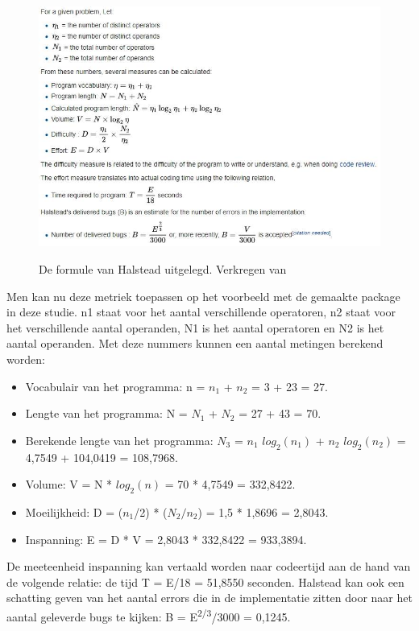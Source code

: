 \begin{figure}
	\begin{center}
		\caption{De formule van Halstead uitgelegd. Verkregen van \textcite{halstead}}
		\includegraphics[width=16cm]{img/halstead}\\[0.5cm]
	\end{center}
\end{figure}


Men kan nu deze metriek toepassen op het voorbeeld met de gemaakte package in deze studie. n1 staat voor het aantal verschillende operatoren, n2 staat voor het verschillende aantal operanden, N1 is het aantal operatoren en N2 is het aantal operanden. Met deze nummers kunnen een aantal metingen berekend worden:
\begin{itemize}
	\item Vocabulair van het programma: n = $n_1$ + $n_2$ = 3 + 23 = 27.
	\item Lengte van het programma: N = $N_1$ + $N_2$ = 27 + 43 = 70.
	\item Berekende lengte van het programma: $N_3$ = $n_1$ $log_{2}(n_1)$ + $n_2$ $log_{2}(n_2)$ = 4,7549 +  104,0419 = 108,7968.
	\item Volume: V = N * $log_{2}(n)$ = 70 * 4,7549 = 332,8422.
	\item Moeilijkheid: D = ($n_1$/2) * ($N_2/n_2$) = 1,5 * 1,8696 = 2,8043.
	\item Inspanning: E = D * V = 2,8043 * 332,8422 = 933,3894.
\end{itemize}
De meeteenheid inspanning kan vertaald worden naar codeertijd aan de hand van de volgende relatie: de tijd T = E/18 = 51,8550 seconden.
Halstead kan ook een schatting geven van het aantal errors die in de implementatie zitten door naar het aantal geleverde bugs te kijken: B = E\textsuperscript{2/3}/3000 = 0,1245.

